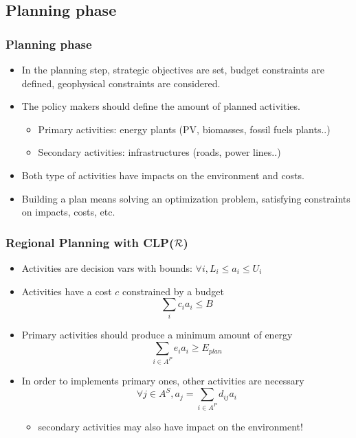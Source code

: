 \documentclass{beamer}
\newcommand{\clpr}{CLP({\ensuremath{\cal R}})}
\begin{document}
\subsection{Planning phase}
	\begin{frame}
	\frametitle{Planning phase}
			\begin{itemize}
			\item In the planning step, strategic objectives are set, budget constraints are defined, geophysical constraints are considered.
			\item The policy makers should define the amount of planned activities.
			\begin{itemize}
				\item Primary activities: energy plants (PV, biomasses, fossil fuels plants..)
				\item Secondary activities: infrastructures (roads, power lines..)
			\end{itemize}
			\item Both type of activities have impacts on the environment and costs.
			\item Building a plan means solving an optimization problem, satisfying constraints on impacts, costs, etc.
		\end{itemize}
	\end{frame}

	\begin{frame}
	\frametitle{Regional Planning with \clpr}
		\begin{itemize}
			\item Activities are decision vars with bounds: $ \forall i, L_i \leq a_i \leq U_i $
			\item Activities have a cost $c$ constrained by a budget $$ \sum_i c_i a_i \leq B $$
			\item Primary activities should produce a minimum amount of energy $$ \sum_{i \in A^P} e_i a_i \geq E_{plan}$$
			\item In order to implements primary ones, other activities are necessary $$ \forall j \in A^S, a_j = \sum_{i \in A^P} d_{ij} a_i  $$
			\begin{itemize}
				\item secondary activities may also have impact on the environment!
			\end{itemize}
		\end{itemize}
	\end{frame}
\end{document}
